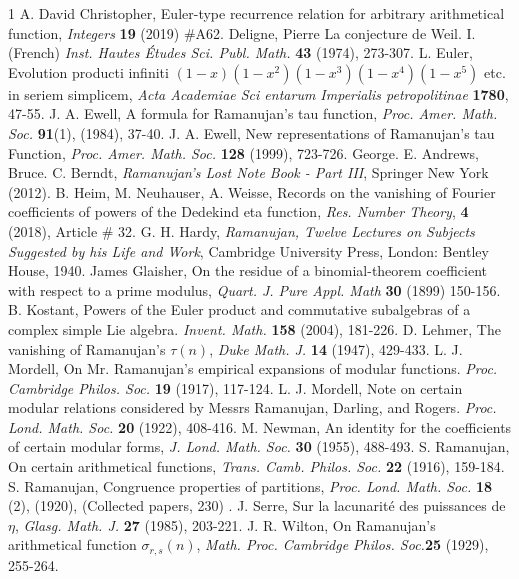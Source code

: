 \documentclass[10pt]{article}
\theoremstyle{definition}
\begin{document}
\begin{thebibliography}{1}\footnotesize
{}
A. David Christopher, Euler-type recurrence relation for arbitrary arithmetical function, {\it Integers} {\bf 19} (2019) $\#$A62.
Deligne, Pierre La conjecture de Weil. I. (French) {\it Inst. Hautes Études Sci. Publ. Math.} {\bf 43} (1974), 273-307.
L. Euler, Evolution producti infiniti $(1-x)(1-x^2)(1-x^3)(1-x^4)(1-x^5)$ etc. in seriem simplicem, {\it Acta Academiae Sci entarum Imperialis petropolitinae} {\bf 1780}, 47-55.
J. A. Ewell, A formula for Ramanujan's tau function, {\it Proc. Amer. Math. Soc.} {\bf 91}(1), (1984), 37-40.
J. A. Ewell, New representations of Ramanujan's tau Function, {\it Proc. Amer. Math. Soc.} {\bf 128} (1999), 723-726.
George. E. Andrews, Bruce. C. Berndt, {\it Ramanujan's Lost Note Book - Part III}, Springer New York (2012).
B. Heim, M. Neuhauser, A. Weisse, Records on the vanishing of Fourier coefficients of powers of the Dedekind eta function, {\it Res. Number Theory}, {\bf{4}} (2018), Article \# 32.
G. H. Hardy, {\it Ramanujan, Twelve Lectures on Subjects Suggested by his Life and Work}, Cambridge University Press, London: Bentley House, 1940.
James Glaisher, On the residue of a binomial-theorem coefficient with respect to a prime modulus, {\it Quart. J. Pure Appl. Math} {\bf 30} (1899) 150-156. 
B. Kostant, Powers of the Euler product and commutative subalgebras of a complex simple Lie algebra. {\it Invent. Math.} {\bf 158} (2004), 181-226.
D. Lehmer, The vanishing of Ramanujan’s $\tau(n)$, {\it Duke Math. J.} {\bf{14}} (1947), 429-433.
L. J. Mordell, On Mr. Ramanujan's empirical expansions of modular functions. {\it Proc. Cambridge Philos. Soc.} {\bf 19} (1917), 117-124.
L. J. Mordell, Note on certain modular relations considered by Messrs Ramanujan, Darling, and Rogers. {\it Proc. Lond. Math. Soc.} {\bf 20} (1922), 408-416.
M. Newman, An identity for the coefficients of certain modular forms, {\it J. Lond. Math. Soc.} {\bf{30}} (1955), 488-493.
S. Ramanujan, On certain arithmetical functions, {\it Trans. Camb. Philos. Soc.} {\bf 22} (1916), 159-184.
S. Ramanujan, Congruence properties of partitions, {\it Proc. Lond. Math. Soc.} {\bf 18} (2), (1920), (Collected papers, 230) .
J. Serre, Sur la lacunarit\'{e} des puissances de $\eta$, {\it Glasg. Math. J.} {\bf{27}} (1985), 203-221. 
J. R. Wilton, On Ramanujan’s arithmetical function $\sigma_{r,s}(n)$, {\it Math. Proc. Cambridge Philos. Soc.}{\bf 25} (1929), 255-264.
\end{thebibliography}
\end{document}
